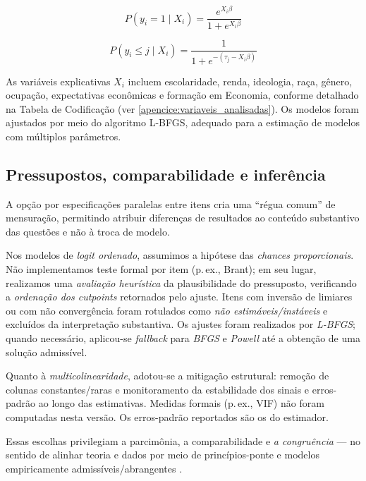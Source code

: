 \begin{equation}
P(y_i = 1 \mid X_i) = \frac{e^{X_i \beta}}{1 + e^{X_i \beta}}
\end{equation}

\begin{equation}
P(y_i \leq j \mid X_i) = \frac{1}{1 + e^{-(\tau_j - X_i \beta)}}
\end{equation}



As variáveis explicativas \(X_i\) incluem escolaridade, renda, ideologia, raça, gênero, ocupação, expectativas econômicas e formação em Economia, conforme detalhado na Tabela de Codificação (ver \autoref{apencice:variaveis_analisadas}). Os modelos foram ajustados por meio do algoritmo L-BFGS, adequado para a estimação de modelos com múltiplos parâmetros.

\subsection{Pressupostos, comparabilidade e inferência}
\label{sec:pressupostos-inferencia}

A opção por especificações paralelas entre itens cria uma ``régua comum'' de mensuração, permitindo atribuir diferenças de resultados ao conteúdo substantivo das questões e não à troca de modelo.

Nos modelos de \textit{logit ordenado}, assumimos a hipótese das \textit{chances proporcionais}. Não implementamos teste formal por item (p.\,ex., Brant); em seu lugar, realizamos uma \textit{avaliação heurística} da plausibilidade do pressuposto, verificando a \textit{ordenação dos cutpoints} retornados pelo ajuste. Itens com inversão de limiares ou com não convergência foram rotulados como \textit{não estimáveis/instáveis} e excluídos da interpretação substantiva. Os ajustes foram realizados por \textit{L-BFGS}; quando necessário, aplicou-se \textit{fallback} para \textit{BFGS} e \textit{Powell} até a obtenção de uma solução admissível.

Quanto à \textit{multicolinearidade}, adotou-se a mitigação estrutural: remoção de colunas constantes/raras e monitoramento da estabilidade dos sinais e erros-padrão ao longo das estimativas. Medidas formais (p.\,ex., VIF) não foram computadas nesta versão. Os erros-padrão reportados são os do estimador.

Essas escolhas privilegiam a parcimônia, a comparabilidade e \textit{a congruência} — no sentido de alinhar teoria e dados por meio de princípios-ponte e modelos empiricamente admissíveis/abrangentes \cite{stigum2003,hausman2008}.

